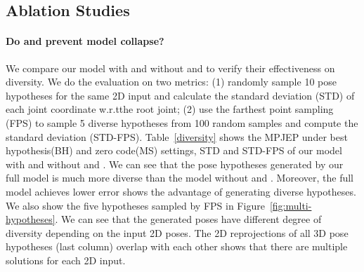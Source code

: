 \documentclass{bmvc2k}
\def\wrt{w.r.t\bmvaOneDot}
\begin{document}
\subsection{Ablation Studies}

\paragraph{Do  and  prevent model collapse?}We compare our model with and without  and  to verify their effectiveness on diversity. 
We do the evaluation on two metrics: (1) randomly sample 10 pose hypotheses for the same 2D input and calculate the standard deviation (STD) of each joint coordinate \wrt the root joint;
(2) use the farthest point sampling (FPS) \cite{eldar1997farthest} to sample 5 diverse hypotheses from 100 random samples and compute the standard deviation (STD-FPS).  
Table~\ref{diversity} shows the MPJEP under best hypothesis(BH) and zero code(MS) settings, STD and STD-FPS of our model with and without  and . We can see that the pose hypotheses generated by our full model is much more diverse than the model without  and . Moreover, the full model achieves lower error shows the advantage of generating diverse hypotheses. We also show the five hypotheses sampled by FPS in Figure~\ref{fig:multi-hypotheses}. We can see that the generated poses have different degree of diversity depending on the input 2D poses. The 2D reprojections of all 3D pose hypotheses (last column) overlap with each other shows that there are multiple solutions for each 2D input. 


\begin{table*}[ht]
\vspace{-3mm}
\centering
{}\quad \quad
{}
\caption{(a):Our model with and without  and . (b): The impact of changing the weights  on the diversity and accuracy}
\vspace{-5mm}
\end{table*}
\end{document}

